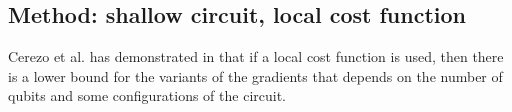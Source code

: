 \subsection{Method: shallow circuit, local cost function}

Cerezo et al. has demonstrated in \cite{cerezoCostFunctionDependent2021} that if a local cost function is used, then there is a lower bound for the variants of the gradients that depends on the number of qubits and some configurations of the circuit.